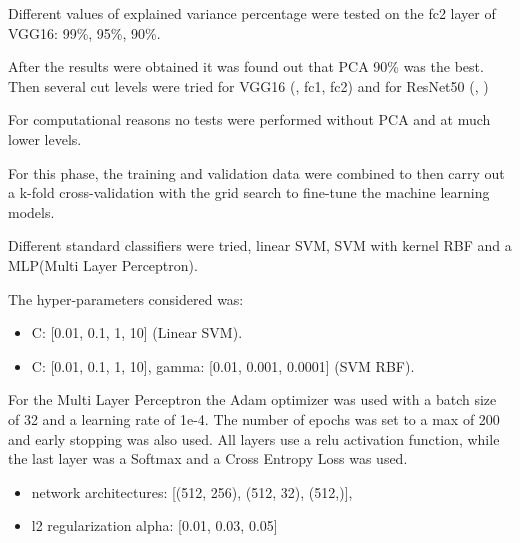 \noindent
Different values of explained variance percentage were tested on the fc2 layer of VGG16: 99\%, 95\%, 90\%.

\noindent
After the results were obtained it was found out that PCA 90\% was the best. 
Then several cut levels were tried for VGG16 (, fc1, fc2) and for ResNet50 (, )

\noindent
For computational reasons no tests were performed without PCA and at much lower levels.

\vspace{5mm}
\noindent
For this phase, the training and validation data were combined to then carry out a k-fold cross-validation with the grid search to fine-tune the machine learning models.

\noindent
Different standard classifiers were tried, linear SVM, SVM with kernel RBF and a MLP(Multi Layer Perceptron).

\noindent
The hyper-parameters considered was:
\begin{itemize}
    \item C: [0.01, 0.1, 1, 10] (Linear SVM).
    \item C: [0.01, 0.1, 1, 10], gamma: [0.01, 0.001, 0.0001] (SVM RBF).
\end{itemize}

\noindent
For the Multi Layer Perceptron the Adam optimizer was used with a batch size of 32 and a learning rate of 1e-4. The number of epochs was set to a max of 200 and early stopping was also used. 
All layers use a relu activation function, while the last layer was a Softmax and a Cross Entropy Loss was used.
\begin{itemize}
    \item network architectures: [(512, 256), (512, 32), (512,)],
    \item l2 regularization alpha: [0.01, 0.03, 0.05]
\end{itemize}
